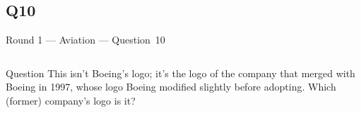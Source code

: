 \documentclass[11pt]{beamer}
\begin{document}
\subsection*{Q10}
\begin{frame}[t]{Round 1 --- Aviation --- \mbox{Question 10}}
\vspace{-0.5em}
\begin{columns}[T,totalwidth=\linewidth]
\begin{column}{0.32\linewidth}
\begin{block}{Question}
This isn't Boeing's logo; it's the logo of the company that merged with Boeing in 1997, whose logo Boeing modified slightly before adopting. Which (former) company's logo is it?
\end{block}
\end{column}
\begin{column}{0.65\linewidth}
\begin{center}
\texttt{[image: \{Images/mcdonnelldouglas]}.png}
\end{center}
\end{column}
\end{columns}
\end{frame}
\end{document}
